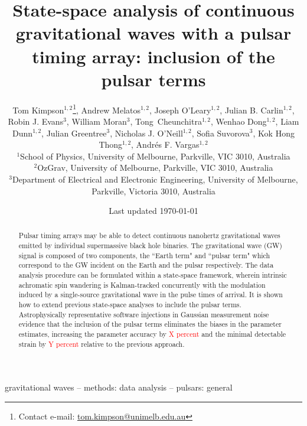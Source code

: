 \documentclass[fleqn,usenatbib,useAMS]{mnras}
\title[State-space PTA]{State-space analysis of continuous gravitational waves with a pulsar timing array: inclusion of the pulsar terms}
\author[Kimpson]{Tom Kimpson$^{1,2}$\thanks{Contact e-mail: \href{tom.kimpson@unimelb.edu.au}{tom.kimpson@unimelb.edu.au}}, Andrew Melatos$^{1,2}$, Joseph O'Leary$^{1,2}$, Julian B. Carlin$^{1,2}$, Robin J. Evans$^{3}$, \newauthor William Moran$^{3}$, Tong Cheunchitra$^{1,2}$, Wenhao Dong$^{1,2}$, Liam Dunn$^{1,2}$, Julian Greentree$^{3}$, Nicholas J. O'Neill$^{1,2}$, \newauthor Sofia Suvorova$^{3}$, Kok Hong Thong$^{1,2}$, Andrés F. Vargas$^{1,2}$%
\\
$^{1}$School of Physics, University of Melbourne, Parkville, VIC 3010, Australia \\
$^{2}$OzGrav, University of Melbourne, Parkville, VIC 3010, Australia \\
$^{3}$Department of Electrical and Electronic Engineering, University of Melbourne, Parkville, Victoria 3010, Australia }
\date{Last updated \today}
\begin{document}
\label{firstpage}
\pagerange{\pageref{firstpage}--\pageref{lastpage}}
\maketitle

\begin{abstract}	
	 Pulsar timing arrays may be able to detect continuous nanohertz gravitational waves emitted by individual supermassive black hole binaries. The gravitational wave (GW) signal is composed of two components, the ``Earth term" and ``pulsar term" which correspond to the GW incident on the Earth and the pulsar respectively. The data analysis procedure can be formulated within a state-space framework, wherein intrinsic achromatic spin wandering is Kalman-tracked concurrently with the modulation induced by a single-source gravitational wave in the pulse times of arrival. It is shown how to extend previous state-space analyses to include the pulsar terms. Astrophysically representative software injections in Gaussian measurement noise evidence that the inclusion of the pulsar terms eliminates the biases in the parameter estimates, increasing the parameter accuracy by \textcolor{red}{X percent} and the minimal detectable strain by \textcolor{red}{Y percent} relative to the previous approach.
\end{abstract}

\begin{keywords}
gravitational waves -- methods: data analysis -- pulsars: general
\end{keywords}



\begingroup
\let\clearpage\relax
\endgroup
\newpage
\end{document}

